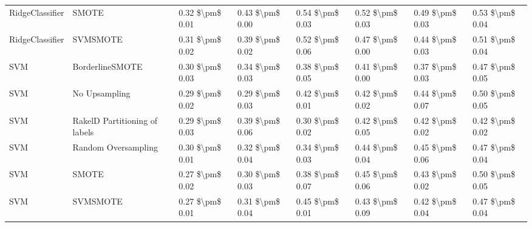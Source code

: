 \begin{tabular}{llllllll}
                RidgeClassifier &                         SMOTE & 0.32 \$\textbackslash pm\$ 0.01 &           0.43 \$\textbackslash pm\$ 0.00 &       0.54 \$\textbackslash pm\$ 0.03 &        0.52 \$\textbackslash pm\$ 0.03 &                         0.49 \$\textbackslash pm\$ 0.03 &     0.53 \$\textbackslash pm\$ 0.04 \\
                RidgeClassifier &                      SVMSMOTE & 0.31 \$\textbackslash pm\$ 0.02 &           0.39 \$\textbackslash pm\$ 0.02 &       0.52 \$\textbackslash pm\$ 0.06 &        0.47 \$\textbackslash pm\$ 0.00 &                         0.44 \$\textbackslash pm\$ 0.03 &     0.51 \$\textbackslash pm\$ 0.04 \\
                            SVM &               BorderlineSMOTE & 0.30 \$\textbackslash pm\$ 0.03 &           0.34 \$\textbackslash pm\$ 0.03 &       0.38 \$\textbackslash pm\$ 0.05 &        0.41 \$\textbackslash pm\$ 0.00 &                         0.37 \$\textbackslash pm\$ 0.03 &     0.47 \$\textbackslash pm\$ 0.05 \\
                            SVM &                 No Upsampling & 0.29 \$\textbackslash pm\$ 0.02 &           0.29 \$\textbackslash pm\$ 0.03 &       0.42 \$\textbackslash pm\$ 0.01 &        0.42 \$\textbackslash pm\$ 0.02 &                         0.44 \$\textbackslash pm\$ 0.07 &     0.50 \$\textbackslash pm\$ 0.05 \\
                            SVM & RakelD Partitioning of labels & 0.29 \$\textbackslash pm\$ 0.03 &           0.39 \$\textbackslash pm\$ 0.06 &       0.30 \$\textbackslash pm\$ 0.02 &        0.42 \$\textbackslash pm\$ 0.05 &                         0.42 \$\textbackslash pm\$ 0.02 &     0.42 \$\textbackslash pm\$ 0.02 \\
                            SVM &           Random Oversampling & 0.30 \$\textbackslash pm\$ 0.01 &           0.32 \$\textbackslash pm\$ 0.04 &       0.34 \$\textbackslash pm\$ 0.03 &        0.44 \$\textbackslash pm\$ 0.04 &                         0.45 \$\textbackslash pm\$ 0.06 &     0.47 \$\textbackslash pm\$ 0.04 \\
                            SVM &                         SMOTE & 0.27 \$\textbackslash pm\$ 0.02 &           0.30 \$\textbackslash pm\$ 0.03 &       0.38 \$\textbackslash pm\$ 0.07 &        0.45 \$\textbackslash pm\$ 0.06 &                         0.43 \$\textbackslash pm\$ 0.02 &     0.50 \$\textbackslash pm\$ 0.05 \\
                            SVM &                      SVMSMOTE & 0.27 \$\textbackslash pm\$ 0.01 &           0.31 \$\textbackslash pm\$ 0.04 &       0.45 \$\textbackslash pm\$ 0.01 &        0.43 \$\textbackslash pm\$ 0.09 &                         0.42 \$\textbackslash pm\$ 0.04 &     0.47 \$\textbackslash pm\$ 0.04 \\

\end{tabular}
